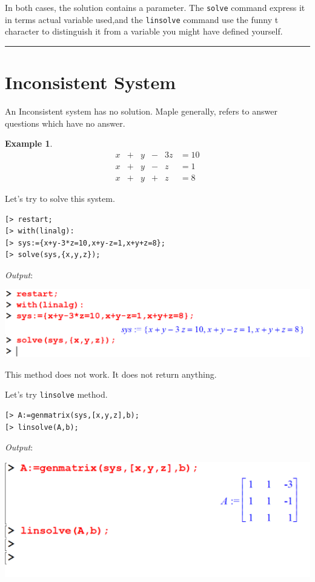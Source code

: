 \documentclass[
]{book}
\theoremstyle{definition}
\theoremstyle{definition}
\newtheorem{example}{Example}[chapter]
\theoremstyle{definition}
\theoremstyle{definition}
\theoremstyle{remark}
\begin{document}
In both cases, the solution contains a parameter.
The \texttt{solve} command express it in terms actual variable used,and the \texttt{linsolve} command use the funny t character to distinguish it from a variable you might have defined yourself.

\begin{center}\rule{0.5\linewidth}{0.5pt}\end{center}

\section{Inconsistent System}\label{inconsistent-system}

An Inconsistent system has no solution. Maple generally, refers to answer questions which have no answer.

\begin{example}
\protect\hypertarget{exm:unnamed-chunk-7}{}\label{exm:unnamed-chunk-7}\[
\begin{array}{ccccccccc}
x &+& y &-& 3z &= 10\\
x &+& y &-&  z &= 1\\
x &+& y &+&  z &= 8  
\end{array}
\]
\end{example}

Let's try to solve this system.

\begin{verbatim}
[> restart;
[> with(linalg):
[> sys:={x+y-3*z=10,x+y-z=1,x+y+z=8};
[> solve(sys,{x,y,z});
\end{verbatim}

\emph{Output}:

\includegraphics{figures/Lesson 5/fig11.png}

This method does not work. It does not return anything.

Let's try \texttt{linsolve} method.

\begin{verbatim}
[> A:=genmatrix(sys,[x,y,z],b);
[> linsolve(A,b);
\end{verbatim}

\emph{Output}:

\includegraphics{figures/Lesson 5/fig12.png}
\end{document}
